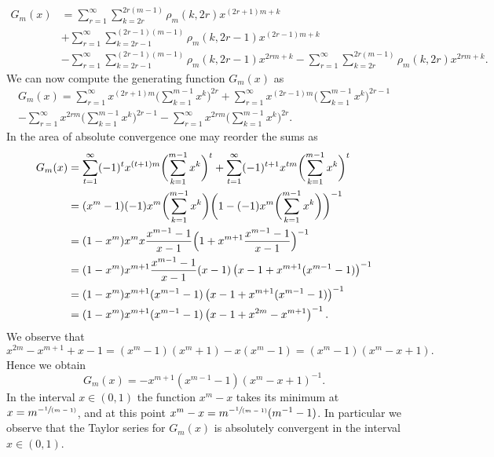 \documentclass[JEP,XML,SOM,Unicode,published]{cedram}
\newcommand{\spfrac}[2]{\sfrac{#1}{(#2)}}
\theoremstyle{definition}
\numberwithin{theorem}{section}
\begin{document}
\begin{equation*}
\begin{split}
G_m(x)&=\sum_{r=1}^{\infty} \sum_{k=2r}^{2r(m-1)}\rho_m(k,2r)x^{(2r+1)m+k}\\
&+ \sum_{r=1}^\infty\sum_{k=2r-1}^{(2r-1)(m-1)}\rho_m(k,2r-1)x^{(2r-1)m+k}\\
&-\sum_{r=1}^\infty \sum_{k=2r-1}^{(2r-1)(m-1)}\rho_m(k,2r-1)x^{2rm+k}-\sum_{r=1}^\infty\sum_{k=2r}^{2r(m-1)}\rho_m(k,2r)x^{2rm+k}.
\end{split}
\end{equation*}
We can now compute the generating function $G_m(x)$ as
\begin{multline*}
G_m(x)= \sum_{r=1}^{\infty} x^{(2r+1)m}\biggl(\sum_{k=1}^{m-1}x^k\biggr)^{2r}+ \sum_{r=1}^\infty x^{(2r-1)m}\biggl(\sum_{k=1}^{m-1}x^k\biggr)^{2r-1}\\
-\sum_{r=1}^\infty x^{2rm}\biggl(\sum_{k=1}^{m-1}x^k\biggr)^{2r-1} -\sum_{r=1}^\infty x^{2rm}\biggl(\sum_{k=1}^{m-1}x^k\biggr)^{2r}.
\end{multline*}
In the area of absolute convergence one may reorder the sums as
\begin{equation*}
\begin{split}
G_m(x)&=\sum_{t=1}^{\infty} (-1)^{t} x^{(t+1)m}\biggl(\sum_{k=1}^{m-1}x^k\biggr)^{t}+ \sum_{t=1}^{\infty} (-1)^{t+1} x^{tm}\biggl(\sum_{k=1}^{m-1}x^k\biggr)^{t}\\
&= (x^m-1)(-1)x^m\biggl(\sum_{k=1}^{m-1}x^k\biggr) \biggl(1- (-1)x^m\biggl(\sum_{k=1}^{m-1}x^k\biggr) \biggr)^{-1}\\
&= (1-x^m)x^mx \frac{x^{m-1}-1}{x-1}\Bigl(1+x^{m+1} \frac{x^{m-1}-1}{x-1}\Bigr)^{-1}\\
&= (1-x^m)x^{m+1} \frac{x^{m-1}-1}{x-1}(x-1)\left(x-1+x^{m+1} (x^{m-1}-1)\right)^{-1}\\
&= (1-x^m)x^{m+1} (x^{m-1}-1)\left(x-1+x^{m+1} (x^{m-1}-1)\right)^{-1}\\
&= (1-x^m)x^{m+1} (x^{m-1}-1)\left(x-1+x^{2m}-x^{m+1}\right)^{-1}.
\end{split}
\end{equation*}
We observe that
\[
x^{2m}-x^{m+1}+x-1= (x^m-1)(x^m +1)-x(x^m-1) = (x^m-1)(x^m-x+1).
\]
Hence we obtain
\[
G_m(x)=- x^{m+1} (x^{m-1}-1)\left(x^m-x+1\right)^{-1}.
\]
In the interval $x\in (0,1)$ the function $x^m-x$ takes its minimum at $x=m^{-\spfrac{1}{m-1}}$, and at this point $x^m-x=m^{-\spfrac{1}{m-1}}(m^{-1}-1)$. In particular we observe that the Taylor series for $G_m(x)$ is absolutely convergent in the interval $x\in (0,1)$.\par
\end{document}
